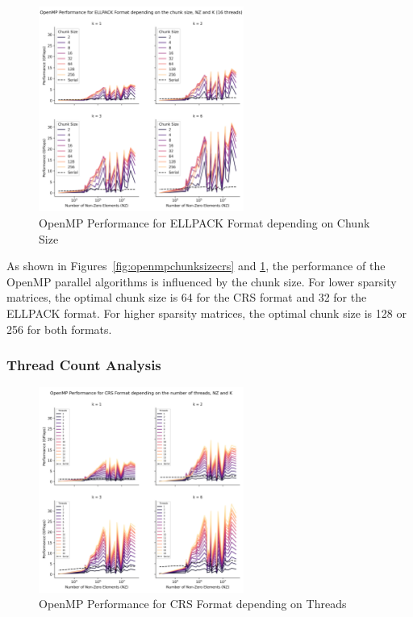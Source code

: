 \documentclass[12pt,oneside]{book} %
\begin{document}
\begin{figure}[H]
    \centering
    \includegraphics[width=0.6\textwidth]{../results/images/openMP_ChunkSize_ELLPACK.png}
    \caption{OpenMP Performance for ELLPACK Format depending on Chunk Size}
    \label{fig:openmpchunksizellpack}
\end{figure}

As shown in Figures~\ref{fig:openmpchunksizecrs} and
\ref{fig:openmpchunksizellpack}, the performance of the OpenMP parallel
algorithms is influenced by the chunk size. For lower sparsity matrices, the
optimal chunk size is 64 for the CRS format and 32 for the ELLPACK format. For
higher sparsity matrices, the optimal chunk size is 128 or 256 for both
formats.

\subsubsection{Thread Count Analysis}
\begin{figure}[H]
    \centering
    \includegraphics[width=0.6\textwidth]{../results/images/openMP_Threads_CRS.png}
    \caption{OpenMP Performance for CRS Format depending on Threads}
    \label{fig:openmpthreadscrs}
\end{figure}
\end{document}
